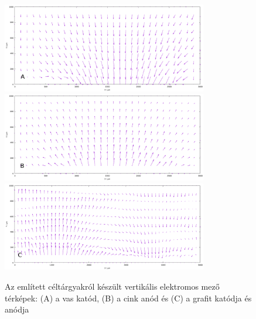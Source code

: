\begin{figure}
\centering
\includegraphics[width=0.8\textwidth]{img/mérések/Fe_v.pdf}
\includegraphics[width=0.8\textwidth]{img/mérések/Zn_v.pdf}
\includegraphics[width=0.8\textwidth]{img/mérések/grafit_v.pdf}

\caption{Az említett céltárgyakról készült vertikális elektromos mező térképek:
(A) a vas katód, (B) a cink anód és (C) a grafit katódja és anódja}
\label{fig:field_v}
\end{figure}

